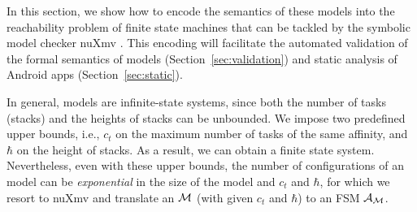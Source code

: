 
In this section, we show how to encode the semantics of these {\AMASS} models into the reachability problem of finite state machines  that can be %
tackled by the symbolic model checker nuXmv \cite{CavadaCDGMMMRT14}. 
%
This encoding will facilitate the automated validation of the formal semantics of {\AMASS} models (Section~\ref{sec:validation}) and static analysis of Android apps (Section~\ref{sec:static}).


In general, {\AMASS} models are infinite-state systems, since %
both the number of tasks (stacks) and the heights of stacks can be unbounded. We impose two predefined upper bounds, i.e., $c_t$ on the maximum number of tasks of the same affinity, and $\hbar$ on the height of stacks. As a result, we can obtain %
a finite state system. 
%
Nevertheless, even with these upper bounds, %
the number of configurations of an {\AMASS} model can be \emph{exponential} in the size of the model and $c_t$ and $\hbar$, %
for which we resort to %
nuXmv \cite{CavadaCDGMMMRT14} and translate an {\AMASS} ${\mathcal{M} }$ (with given $c_t$ and $\hbar$) to an FSM ${\mathcal{A} }_{\mathcal{M} }$. 

%
%

